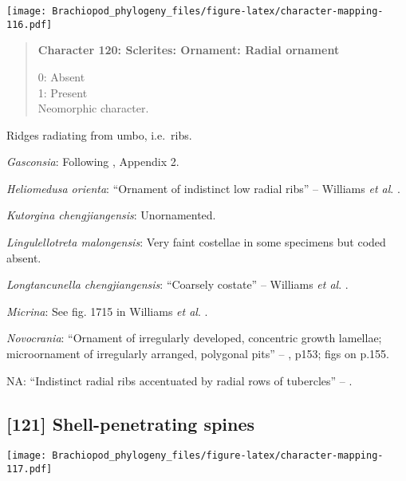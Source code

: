 \documentclass[openany]{book}
\theoremstyle{definition}
\theoremstyle{definition}
\theoremstyle{definition}
\theoremstyle{remark}
\begin{document}
\texttt{[image: Brachiopod\_phylogeny\_files/figure-latex/character-mapping-116.pdf]}

\begin{quote}
\textbf{Character 120: Sclerites: Ornament: Radial ornament}

0: Absent\\
1: Present\\
Neomorphic character.
\end{quote}

Ridges radiating from umbo, i.e.~ribs.

\hypertarget{Gasconsia-coding-120}{}
\emph{Gasconsia}: Following \citet{Williams1998Thediversity}, Appendix
2.

\hypertarget{Heliomedusa_orienta-coding-120}{}
\emph{Heliomedusa orienta}: ``Ornament of indistinct low radial ribs''
-- Williams \emph{et al}.
\citeyearpar[p167]{Williams2000LinguliformeaCraniiformea}.

\hypertarget{Kutorgina_chengjiangensis-coding-120}{}
\emph{Kutorgina chengjiangensis}: Unornamented.

\hypertarget{Lingulellotreta_malongensis-coding-120}{}
\emph{Lingulellotreta malongensis}: Very faint costellae in some
specimens but coded absent.

\hypertarget{Longtancunella_chengjiangensis-coding-120}{}
\emph{Longtancunella chengjiangensis}: ``Coarsely costate'' -- Williams
\emph{et al}. \citeyearpar[p710]{Williams2000LinguliformeaCraniiformea}.

\hypertarget{Micrina-coding-120}{}
\emph{Micrina}: See fig. 1715 in Williams \emph{et al}.
\citeyearpar{Williams2007Supplement}.

\hypertarget{Novocrania-coding-120}{}
\emph{Novocrania}: ``Ornament of irregularly developed, concentric
growth lamellae; microornament of irregularly arranged, polygonal pits''
-- \citet{Williams2000LinguliformeaCraniiformea}, p153; figs on p.155.

\hypertarget{NA-coding-120}{}
NA: ``Indistinct radial ribs accentuated by radial rows of tubercles''
-- \citet{Popov2009Earlyontogeny}.

\subsection*{{[}121{]} Shell-penetrating
spines}\label{shell-penetrating-spines}

\texttt{[image: Brachiopod\_phylogeny\_files/figure-latex/character-mapping-117.pdf]}
\end{document}
